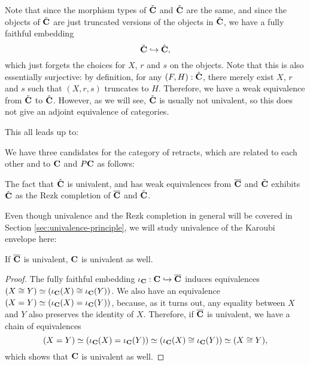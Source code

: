 \begin{remark}
  Note that since the morphism types of $ \tilde {\mathbf{C}} $ and $ \hat {\mathbf{C}} $ are the same, and since the objects of $ \hat {\mathbf{C}} $ are just truncated versions of the objects in $ \tilde {\mathbf{C}} $, we have a fully faithful embedding
  \[ \tilde {\mathbf{C}} \hookrightarrow \hat {\mathbf{C}}, \]
  which just forgets the choices for $ X $, $ r $ and $ s $ on the objects. Note that this is also essentially surjective: by definition, for any $ (F, H) : \hat {\mathbf{C}} $, there merely exist $ X $, $ r $ and $ s $ such that $ (X, r, s) $ truncates to $ H $.
  Therefore, we have a weak equivalence from $ \tilde {\mathbf{C}} $ to $ \hat {\mathbf{C}} $. However, as we will see, $ \tilde {\mathbf{C}} $ is usually not univalent, so this does not give an adjoint equivalence of categories.
\end{remark}

This all leads up to:
\begin{corollary}\label{cor:karoubi-candidates}
  We have three candidates for the category of retracts, which are related to each other and to $ \mathbf{C} $ and $ P\mathbf{C} $ as follows:
  \begin{center}
  \end{center}
  The fact that $ \hat {\mathbf{C}} $ is univalent, and has weak equivalences from $ \overline {\mathbf{C}} $ and $ \tilde {\mathbf{C}} $ exhibits $ \hat {\mathbf{C}} $ as the Rezk completion of $ \overline {\mathbf{C}} $ and $ \tilde {\mathbf{C}} $.
\end{corollary}

Even though univalence and the Rezk completion in general will be covered in Section \ref{sec:univalence-principle}, we will study univalence of the Karoubi envelope here:

\begin{lemma}\label{rem:karoubi-univalent}
  If $ \overline {\mathbf{C}} $ is univalent, $ \mathbf{C} $ is univalent as well.
\end{lemma}
\begin{proof}
  The fully faithful embedding $ \iota_{\mathbf{C}} : \mathbf{C} \hookrightarrow \overline {\mathbf{C}} $ induces equivalences $ (X \cong Y) \simeq (\iota_{\mathbf{C}}(X) \cong \iota_{\mathbf{C}}(Y)) $. We also have an equivalence $ (X = Y) \simeq (\iota_{\mathbf{C}}(X) = \iota_{\mathbf{C}}(Y)) $, because, as it turns out, any equality between $ X $ and $ Y $ also preserves the identity of $ X $. Therefore, if $ \overline {\mathbf{C}} $ is univalent, we have a chain of equivalences
  \[ (X = Y) \simeq (\iota_{\mathbf{C}}(X) = \iota_{\mathbf{C}}(Y)) \simeq (\iota_{\mathbf{C}}(X) \cong \iota_{\mathbf{C}}(Y)) \simeq (X \cong Y), \]
  which shows that $ \mathbf{C} $ is univalent as well.
\end{proof}


